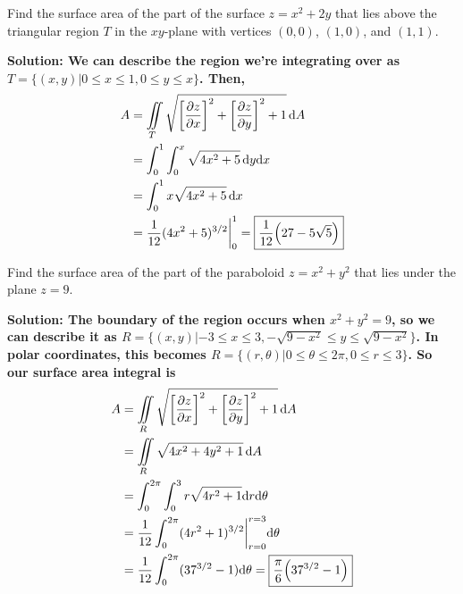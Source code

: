 \begin{example}
    Find the surface area of the part of the surface $z=x^2+2y$ that lies above the triangular region $T$ in the $xy$-plane with vertices $(0,0)$, $(1, 0)$, and $(1,1)$. \par
    \bf{Solution: }We can describe the region we're integrating over as $T = \{(x,y)|0\leq x\leq 1, 0\leq y\leq x\}$. Then,
    \begin{align*}
        A &= \iint\limits_T \sqrt{\bqty{\pdv{z}{x}}^2+\bqty{\pdv{z}{y}}^2+1}\,\dd A \\
        &= \int_0^1\int_0^x \sqrt{4x^2+5}\,\dd y\dd x \\
        &= \int_0^1 x\sqrt{4x^2+5}\,\dd x \\
        &= \frac{1}{12}(4x^2+5)^{3/2}\biggr|_0^1 = \boxed{\frac{1}{12}\pqty{27-5\sqrt{5}}}
    \end{align*}
\end{example}
\begin{example}
    Find the surface area of the part of the paraboloid $z=x^2+y^2$ that lies under the plane $z=9$.\par
    \bf{Solution: }The boundary of the region occurs when $x^2+y^2=9$, so we can describe it as $R = \{(x,y)|-3\leq x\leq 3, -\sqrt{9-x^2}\leq y\leq \sqrt{9-x^2}\}$. In polar coordinates, this becomes $R = \{(r,\theta)|0\leq \theta\leq2\pi, 0\leq r\leq 3\}$. So our surface area integral is
    \begin{align*}
        A &= \iint\limits_R\sqrt{\bqty{\pdv{z}{x}}^2+\bqty{\pdv{z}{y}}^2+1}\,\dd A \\
        &= \iint\limits_R\sqrt{4x^2+4y^2+1}\, \dd A \\
        &= \int_0^{2\pi}\int_0^3 r\sqrt{4r^2+1}\dd r\dd \theta \\
        &= \frac{1}{12}\int_0^{2\pi}(4r^2+1)^{3/2}\biggr|_{r=0}^{r=3}\dd \theta \\
        &= \frac{1}{12}\int_0^{2\pi}(37^{3/2} - 1)\dd \theta = \boxed{\frac{\pi}{6}\pqty{37^{3/2}-1}}
    \end{align*}
\end{example}

